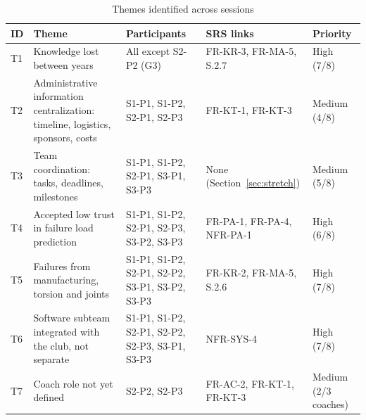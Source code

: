 \documentclass{article}
\newcommand{\rid}[1]{\mbox{#1}}
\begin{document}
\begin{table}[H]
\centering
\caption{Themes identified across sessions}
\label{tab:themes}
\small
\begin{tabularx}{\textwidth}{@{}L{0.6cm} L{3.1cm} L{3.0cm} Y L{1.6cm}@{}}
\toprule
\textbf{ID} & \textbf{Theme} & \textbf{Participants} & \textbf{SRS links} & \textbf{Priority} \\
\midrule
T1 & Knowledge lost between years & All except S2-P2 (G3) & \rid{FR-KR-3}, \rid{FR-MA-5}, S.2.7 & High (7/8) \\
T2 & Administrative information centralization: timeline, logistics, sponsors, costs & S1-P1, S1-P2, S2-P1, S2-P3 & \rid{FR-KT-1}, \rid{FR-KT-3} & Medium (4/8) \\
T3 & Team coordination: tasks, deadlines, milestones & S1-P1, S1-P2, S2-P1, S3-P1, S3-P3 & None (Section~\ref{sec:stretch}) & Medium (5/8) \\
T4 & Accepted low trust in failure load prediction & S1-P1, S1-P2, S2-P1, S2-P3, S3-P2, S3-P3 & \rid{FR-PA-1}, \rid{FR-PA-4}, \rid{NFR-PA-1} & High (6/8) \\
T5 & Failures from manufacturing, torsion and joints & S1-P1, S1-P2, S2-P1, S2-P2, S3-P1, S3-P2, S3-P3 & \rid{FR-KR-2}, \rid{FR-MA-5}, S.2.6 & High (7/8) \\
T6 & Software subteam integrated with the club, not separate & S1-P1, S1-P2, S2-P1, S2-P2, S2-P3, S3-P1, S3-P3 & \rid{NFR-SYS-4} & High (7/8) \\
T7 & Coach role not yet defined & S2-P2, S2-P3 & \rid{FR-AC-2}, \rid{FR-KT-1}, \rid{FR-KT-3} & Medium (2/3 coaches) \\
\bottomrule
\end{tabularx}
\end{table}
\end{document}
